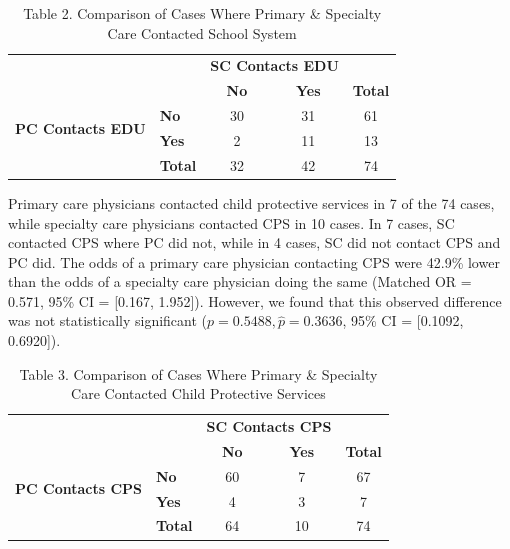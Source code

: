 \documentclass{article}
\begin{document}
	\newpage
	\begin{table}[h]
		\centering
		\footnotesize
		\captionsetup{labelformat=empty}
		\caption{Table 2. Comparison of Cases Where Primary \& Specialty Care Contacted School System}
		\renewcommand{\arraystretch}{1.2}
		\begin{tabular}{llccc}
			\toprule
			& & \multicolumn{2}{c}{\textbf{SC Contacts EDU}} & \\  
			\cmidrule(lr){3-4}
			& & \textbf{No} & \textbf{Yes} & \textbf{Total} \\  
			\midrule
			\multirow{2}{*}{\textbf{PC Contacts EDU}} & \textbf{No} & 30 & 31 & 61 \\  
			& \textbf{Yes} & 2 & 11 & 13 \\  
			\midrule
			& \textbf{Total} & 32 & 42 & 74 \\  
			\bottomrule
		\end{tabular}
		\label{tab:pc_sc_edu}
	\end{table}

	Primary care physicians contacted child protective services in 7 of the 74 cases, while specialty care physicians contacted CPS in 10 cases. In 7 cases, SC contacted CPS where PC did not, while in 4 cases, SC did not contact CPS and PC did. The odds of a primary care physician contacting CPS were 42.9\% lower than the odds of a specialty care physician doing the same (Matched OR = 0.571,  95\% CI = [0.167, 1.952]). However, we found that this observed difference was not statistically significant ($p = 0.5488, \hat{p} = 0.3636$, 95\% CI = [0.1092, 0.6920]).

	\begin{table}[h]
		\centering
		\footnotesize
		\captionsetup{labelformat=empty}
		\caption{Table 3. Comparison of Cases Where Primary \& Specialty Care Contacted Child Protective Services}
		\renewcommand{\arraystretch}{1.2}
		\begin{tabular}{llccc}
			\toprule
			& & \multicolumn{2}{c}{\textbf{SC Contacts CPS}} & \\  
			\cmidrule(lr){3-4}
			& & \textbf{No} & \textbf{Yes} & \textbf{Total} \\  
			\midrule
			\multirow{2}{*}{\textbf{PC Contacts CPS}} & \textbf{No} & 60 & 7 & 67 \\  
			& \textbf{Yes} & 4 & 3 & 7 \\  
			\midrule
			& \textbf{Total} & 64 & 10 & 74 \\  
			\bottomrule
		\end{tabular}
		\label{tab:pc_sc_cps}
	\end{table}
\end{document}
